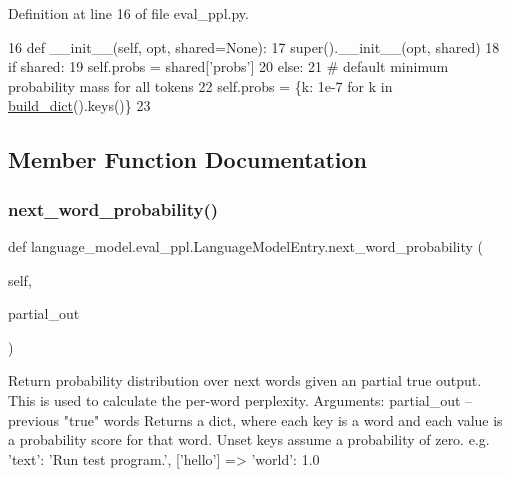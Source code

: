 Definition at line 16 of file eval\+\_\+ppl.\+py.


\begin{DoxyCode}
16     \textcolor{keyword}{def }\_\_init\_\_(self, opt, shared=None):
17         super().\_\_init\_\_(opt, shared)
18         \textcolor{keywordflow}{if} shared:
19             self.probs = shared[\textcolor{stringliteral}{'probs'}]
20         \textcolor{keywordflow}{else}:
21             \textcolor{comment}{# default minimum probability mass for all tokens}
22             self.probs = \{k: 1e-7 \textcolor{keywordflow}{for} k \textcolor{keywordflow}{in} \hyperlink{namespacebuild__dict}{build\_dict}().keys()\}
23 
\end{DoxyCode}


\subsection{Member Function Documentation}
\mbox{\label{classlanguage__model_1_1eval__ppl_1_1LanguageModelEntry_a16e77aba535b4451ea5071723e271336}} 
\subsubsection{\texorpdfstring{next\+\_\+word\+\_\+probability()}{next\_word\_probability()}}
{\footnotesize\ttfamily def language\+\_\+model.\+eval\+\_\+ppl.\+Language\+Model\+Entry.\+next\+\_\+word\+\_\+probability (\begin{DoxyParamCaption}\item[{}]{self,  }\item[{}]{partial\+\_\+out }\end{DoxyParamCaption})}

\begin{DoxyVerb}Return probability distribution over next words given an partial
true output. This is used to calculate the per-word perplexity.
Arguments:
partial_out -- previous "true" words
Returns a dict, where each key is a word and each value is a probability
score for that word. Unset keys assume a probability of zero.
e.g.
{'text': 'Run test program.'}, ['hello'] => {'world': 1.0}
\end{DoxyVerb}
 

